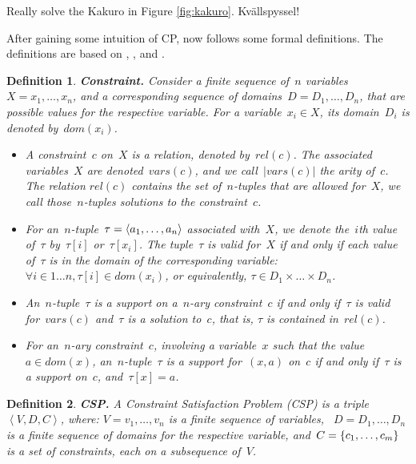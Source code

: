 \documentclass[a4paper,11pt]{article}
\newtheorem{definition}{Definition}
\newcommand{\Todo}[1]{{\color{blue}#1}}
\numberwithin{equation}{section}
\begin{document}
\Todo{Really solve the Kakuro in Figure \ref{fig:kakuro}. Kvällspyssel!}

\smallskip 

After gaining some intuition of CP, now follows some formal definitions.
The definitions are based on
\cite{SchulteCarlsson:FDsys}, \cite{Apt:constraintsBook}, and \cite{Gecode:MPG}.

\begin{definition}
  \textbf{Constraint.} Consider a finite sequence of~$n$ 
  variables~$X = x_1,\ldots,x_n$, and a corresponding sequence of
  \emph{domains}~$D = D_1,\ldots,D_n$, that are possible values for the
  respective variable. 
  For a variable~$x_i \in X$, its domain~$D_i$ is denoted 
  by~$dom(x_i)$.
  \begin{itemize}
    \item   A \emph{constraint}~$c$ on~$X$ is a relation, 
      denoted by~$rel(c)$. The associated variables~$X$ are denoted~$vars(c)$,
      and we call~$|vars(c)|$ the \emph{arity} of~$c$. The relation
      $rel(c)$ contains the set of~$n$-tuples that are allowed
      for~$X$, we call those~$n$-tuples \emph{solutions} to the constraint~$c$.
    \item   For an~$n$-tuple~$\tau = \left\langle a_1,\ldots,a_n\right\rangle$ associated with~$X$, we
      denote the~$i$th value of~$\tau$ by~$\tau[i]$ or~$\tau[x_i]$. The 
      tuple~$\tau$ is \emph{valid} for~$X$
      if and only if each value of~$\tau$ is in the domain of the corresponding
      variable: $\forall i \in 1 \ldots n, \tau[i] \in dom(x_i)$, or equivalently,
      $\tau \in D_1 \times \ldots \times D_n$.
    \item An~$n$-tuple~$\tau$ is a \emph{support} on a~$n$-ary constraint~$c$ if and only
      if~$\tau$ is valid for~$vars(c)$ and~$\tau$ is a solution to~$c$, that is,
      $\tau$ is contained in~$rel(c)$.
    \item For an~$n$-ary constraint~$c$, involving a variable~$x$ such that
      the value~$a \in dom(x)$, an~$n$-tuple~$\tau$ is a 
      \emph{support for}~$(x,a)$ on~$c$ if and only if~$\tau$ is a support on~$c$,
      and~$\tau[x] = a$.
    \end{itemize}
\end{definition}

\begin{definition}
  \textbf{CSP.} A Constraint Satisfaction Problem (CSP) is a 
  triple~$\left<V,D,C\right>$, where:
  $V = v_1, \ldots, v_n$ is a finite sequence of variables,
  ~$D = D_1, \ldots, D_n$ is a finite sequence of domains for the respective variable,
  and~$C = \left\{c_1, \ldots, c_m\right\}$ is a set of constraints, each on a subsequence of~$V$.
\end{definition}
\end{document}
